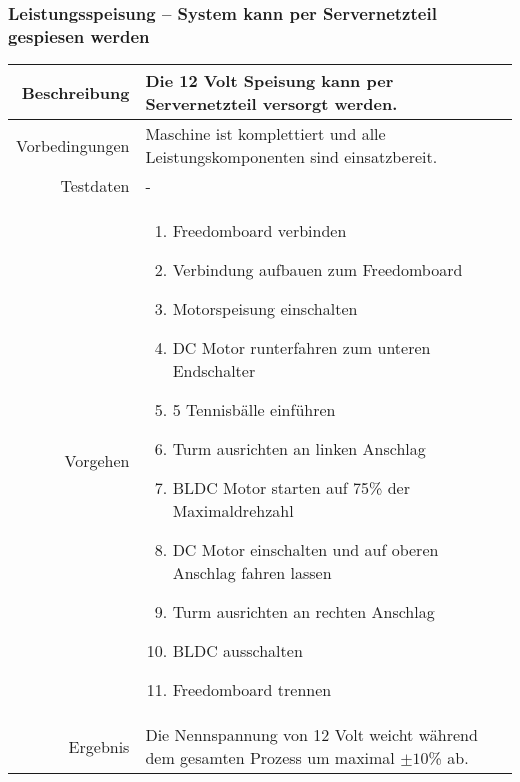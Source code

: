 \subsubsection{Leistungsspeisung -- System kann per Servernetzteil gespiesen werden}
\begin{table}[h!]
	\renewcommand{\arraystretch}{1.5}
	\begin{tabular}{|r|p{14cm}|}
		\hline Beschreibung	&
			Die 12 Volt Speisung kann per Servernetzteil versorgt werden. \\ 
		\hline Vorbedingungen	&
			Maschine ist komplettiert und alle Leistungskomponenten
			sind einsatzbereit. \\ 
		\hline Testdaten	& - \\ 
		\hline Vorgehen		& 
		\begin{enumerate}
			\item Freedomboard verbinden
			\item Verbindung aufbauen zum Freedomboard
			\item Motorspeisung einschalten
			\item DC Motor runterfahren zum unteren Endschalter
			\item 5 Tennisbälle einführen
			\item Turm ausrichten an linken Anschlag
			\item BLDC Motor starten auf 75\% der Maximaldrehzahl
			\item DC Motor einschalten und auf oberen Anschlag fahren lassen
			\item Turm ausrichten an rechten Anschlag
			\item BLDC ausschalten
			\item Freedomboard trennen
		\end{enumerate} \\ 
		\hline Ergebnis 	&
			Die Nennspannung von 12 Volt weicht während dem gesamten
			Prozess um maximal $\pm10$\% ab. \\ 
		\hline 
	\end{tabular}
\end{table}

